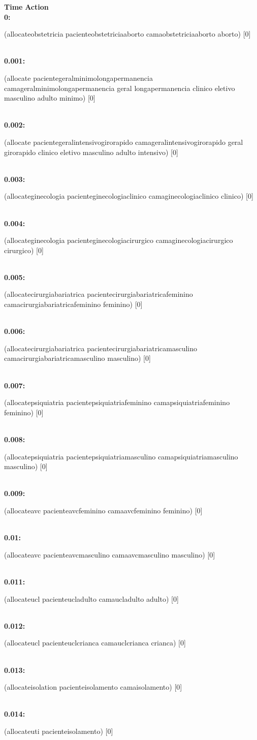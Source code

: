 \documentclass[a4paper,12pt]{article}
\newcommand{\headingtimeaction}{{\bf Time} \qquad \= {\bf Action}\\[0.8ex]}
\newcommand{\atime}[1]{{\bf #1:}}
\newcommand{\action}[1]{{\sf #1}}
\newcommand{\listrow}[1]{\begin{minipage}[t]{11.5cm} #1 \end{minipage}}
\begin{document}
\begin{tabbing}
\headingtimeaction 
\atime{0} \> \listrow{\action{(allocateobstetricia pacienteobstetriciaaborto camaobstetriciaaborto aborto) [0]}}\\
\atime{0.001} \> \listrow{\action{(allocate pacientegeralminimolongapermanencia camageralminimolongapermanencia geral longapermanencia clinico eletivo masculino adulto minimo) [0]}}\\
\atime{0.002} \> \listrow{\action{(allocate pacientegeralintensivogirorapido camageralintensivogirorapido geral girorapido clinico eletivo masculino adulto intensivo) [0]}}\\
\atime{0.003} \> \listrow{\action{(allocateginecologia pacienteginecologiaclinico camaginecologiaclinico clinico) [0]}}\\
\atime{0.004} \> \listrow{\action{(allocateginecologia pacienteginecologiacirurgico camaginecologiacirurgico cirurgico) [0]}}\\
\atime{0.005} \> \listrow{\action{(allocatecirurgiabariatrica pacientecirurgiabariatricafeminino camacirurgiabariatricafeminino feminino) [0]}}\\
\atime{0.006} \> \listrow{\action{(allocatecirurgiabariatrica pacientecirurgiabariatricamasculino camacirurgiabariatricamasculino masculino) [0]}}\\
\atime{0.007} \> \listrow{\action{(allocatepsiquiatria pacientepsiquiatriafeminino camapsiquiatriafeminino feminino) [0]}}\\
\atime{0.008} \> \listrow{\action{(allocatepsiquiatria pacientepsiquiatriamasculino camapsiquiatriamasculino masculino) [0]}}\\
\atime{0.009} \> \listrow{\action{(allocateavc pacienteavcfeminino camaavcfeminino feminino) [0]}}\\
\atime{0.01} \> \listrow{\action{(allocateavc pacienteavcmasculino camaavcmasculino masculino) [0]}}\\
\atime{0.011} \> \listrow{\action{(allocateucl pacienteucladulto camaucladulto adulto) [0]}}\\
\atime{0.012} \> \listrow{\action{(allocateucl pacienteuclcrianca camauclcrianca crianca) [0]}}\\
\atime{0.013} \> \listrow{\action{(allocateisolation pacienteisolamento camaisolamento) [0]}}\\
\atime{0.014} \> \listrow{\action{(allocateuti pacienteisolamento) [0]}}\\
\end{tabbing}
\end{document}
